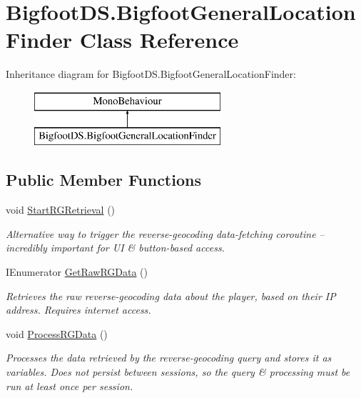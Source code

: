 \hypertarget{class_bigfoot_d_s_1_1_bigfoot_general_location_finder}{}\section{Bigfoot\+D\+S.\+Bigfoot\+General\+Location\+Finder Class Reference}
\label{class_bigfoot_d_s_1_1_bigfoot_general_location_finder}
Inheritance diagram for Bigfoot\+D\+S.\+Bigfoot\+General\+Location\+Finder\+:\begin{figure}[H]
\begin{center}
\leavevmode
\includegraphics[height=2.000000cm]{class_bigfoot_d_s_1_1_bigfoot_general_location_finder}
\end{center}
\end{figure}
\subsection*{Public Member Functions}
\begin{DoxyCompactItemize}
\item 
void \mbox{\hyperlink{class_bigfoot_d_s_1_1_bigfoot_general_location_finder_a5e9cee69dcb8b0537be70f6e7ef8dba2}{Start\+R\+G\+Retrieval}} ()
\begin{DoxyCompactList}\small\item\em Alternative way to trigger the reverse-\/geocoding data-\/fetching coroutine -- incredibly important for UI \& button-\/based access. \end{DoxyCompactList}\item 
I\+Enumerator \mbox{\hyperlink{class_bigfoot_d_s_1_1_bigfoot_general_location_finder_a6fbed1e746517af8589df774e582771e}{Get\+Raw\+R\+G\+Data}} ()
\begin{DoxyCompactList}\small\item\em Retrieves the raw reverse-\/geocoding data about the player, based on their IP address. Requires internet access. \end{DoxyCompactList}\item 
void \mbox{\hyperlink{class_bigfoot_d_s_1_1_bigfoot_general_location_finder_a9740c9ca17041986a3c02e4597105b04}{Process\+R\+G\+Data}} ()
\begin{DoxyCompactList}\small\item\em Processes the data retrieved by the reverse-\/geocoding query and stores it as variables. Does not persist between sessions, so the query \& processing must be run at least once per session. \end{DoxyCompactList}\end{DoxyCompactItemize}

